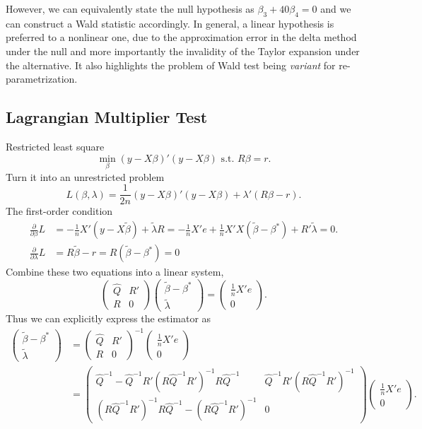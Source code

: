 \documentclass[11pt]{article}
\begin{document}
However, we can equivalently state the null hypothesis as
\(\beta_{3}+40\beta_{4}=0\) and we can construct a Wald statistic
accordingly. In general, a linear hypothesis is preferred to a nonlinear
one, due to the approximation error in the delta method under the null
and more importantly the invalidity of the Taylor expansion under the
alternative. It also highlights the problem of Wald test being
\emph{variant} for re-parametrization.

    \subsection{Lagrangian Multiplier
Test}\label{lagrangian-multiplier-test}

Restricted least square
\[\min_{\beta}\left(y-X\beta\right)'\left(y-X\beta\right)\mbox{ s.t. }R\beta=r.\]
Turn it into an unrestricted problem
\[L\left(\beta,\lambda\right)=\frac{1}{2n}\left(y-X\beta\right)'\left(y-X\beta\right)+\lambda'\left(R\beta-r\right).\]
The first-order condition 
\begin{align*}
\frac{\partial}{\partial\beta}L & =  -\frac{1}{n}X'\left(y-X\tilde{\beta}\right)+\tilde{\lambda}R=-\frac{1}{n}X'e+\frac{1}{n}X'X\left(\tilde{\beta}-\beta^{*}\right)+R'\tilde{\lambda}=0.\\
\frac{\partial}{\partial\lambda}L & =  R\tilde{\beta}-r=R\left(\tilde{\beta}-\beta^{*}\right)=0
\end{align*}
Combine these two equations into a linear system,
\[
\begin{pmatrix}
\widehat{Q} & R'\\
R & 0
\end{pmatrix}\begin{pmatrix}\tilde{\beta}-\beta^{*}\\
\tilde{\lambda}
\end{pmatrix}=\begin{pmatrix}\frac{1}{n}X'e\\
0
\end{pmatrix}.\]
Thus we can explicitly express the estimator as
\[\begin{aligned}
  \begin{pmatrix}\tilde{\beta}-\beta^{*}\\
\tilde{\lambda}
\end{pmatrix}
& =\begin{pmatrix}\widehat{Q} & R'\\
R & 0
\end{pmatrix}^{-1}
\begin{pmatrix}\frac{1}{n}X'e\\
0
\end{pmatrix}\\
 & =  \begin{pmatrix}\widehat{Q}^{-1}-\widehat{Q}^{-1}R'\left(R\widehat{Q}^{-1}R'\right)^{-1}R\widehat{Q}^{-1} & \widehat{Q}^{-1}R'\left(R\widehat{Q}^{-1}R'\right)^{-1}\\
\left(R\widehat{Q}^{-1}R'\right)^{-1}R\widehat{Q}^{-1}  -\left(R\widehat{Q}^{-1}R'\right)^{-1} & 0
\end{pmatrix}
\begin{pmatrix}\frac{1}{n}X'e\\
0
\end{pmatrix}.\end{aligned}\]
\end{document}
